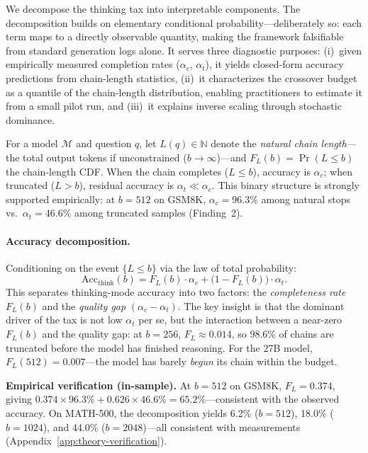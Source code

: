 
We decompose the thinking tax into interpretable components.
The decomposition builds on elementary conditional probability---deliberately so: each term maps to a directly observable quantity, making the framework falsifiable from standard generation logs alone.
It serves three diagnostic purposes: (i)~given empirically measured completion rates ($\alpha_c$, $\alpha_t$), it yields closed-form accuracy predictions from chain-length statistics, (ii)~it characterizes the crossover budget as a quantile of the chain-length distribution, enabling practitioners to estimate it from a small pilot run, and (iii)~it explains inverse scaling through stochastic dominance.

For a model $\mathcal{M}$ and question $q$, let $L(q) \in \mathbb{N}$ denote the \emph{natural chain length}---the total output tokens if unconstrained ($b \to \infty$)---and $F_L(b) = \Pr(L \le b)$ the chain-length CDF.
When the chain completes ($L \le b$), accuracy is $\alpha_c$; when truncated ($L > b$), residual accuracy is $\alpha_t \ll \alpha_c$.
This binary structure is strongly supported empirically: at $b{=}512$ on GSM8K, $\alpha_c = 96.3\%$ among natural stops vs.\ $\alpha_t = 46.6\%$ among truncated samples (Finding~2).

\paragraph{Accuracy decomposition.}
\label{prop:acc-decomp}
Conditioning on the event $\{L \le b\}$ via the law of total probability:
\begin{equation}
  \mathrm{Acc}_{\mathrm{think}}(b)
  = F_L(b) \cdot \alpha_c
  + \bigl(1 - F_L(b)\bigr) \cdot \alpha_t.
  \label{eq:acc-decomp}
\end{equation}
This separates thinking-mode accuracy into two factors: the \emph{completeness rate} $F_L(b)$ and the \emph{quality gap} $(\alpha_c - \alpha_t)$.
The key insight is that the dominant driver of the tax is not low $\alpha_t$ per se, but the interaction between a near-zero $F_L(b)$ and the quality gap: at $b{=}256$, $F_L \approx 0.014$, so 98.6\% of chains are truncated before the model has finished reasoning.
For the 27B model, $F_L(512) = 0.007$---the model has barely \emph{begun} its chain within the budget.

\noindent\textbf{Empirical verification (in-sample).}
At $b{=}512$ on GSM8K, $F_L = 0.374$, giving $0.374 \times 96.3\% + 0.626 \times 46.6\% = 65.2\%$---consistent with the observed accuracy.
On MATH-500, the decomposition yields 6.2\% ($b{=}512$), 18.0\% ($b{=}1024$), and 44.0\% ($b{=}2048$)---all consistent with measurements (Appendix~\ref{app:theory-verification}).

